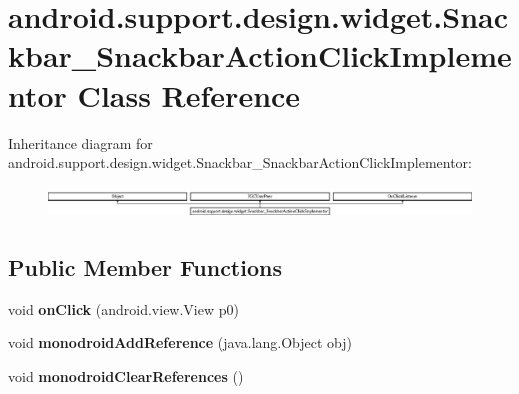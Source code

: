 \hypertarget{classandroid_1_1support_1_1design_1_1widget_1_1_snackbar___snackbar_action_click_implementor}{}\section{android.\+support.\+design.\+widget.\+Snackbar\+\_\+\+Snackbar\+Action\+Click\+Implementor Class Reference}
\label{classandroid_1_1support_1_1design_1_1widget_1_1_snackbar___snackbar_action_click_implementor}
Inheritance diagram for android.\+support.\+design.\+widget.\+Snackbar\+\_\+\+Snackbar\+Action\+Click\+Implementor\+:\begin{figure}[H]
\begin{center}
\leavevmode
\includegraphics[height=0.848485cm]{classandroid_1_1support_1_1design_1_1widget_1_1_snackbar___snackbar_action_click_implementor}
\end{center}
\end{figure}
\subsection*{Public Member Functions}
\begin{DoxyCompactItemize}
\item 
\mbox{\label{classandroid_1_1support_1_1design_1_1widget_1_1_snackbar___snackbar_action_click_implementor_a586c92095bd4bf2197feac9cf0024e30}} 
void {\bfseries on\+Click} (android.\+view.\+View p0)
\item 
\mbox{\label{classandroid_1_1support_1_1design_1_1widget_1_1_snackbar___snackbar_action_click_implementor_a16a751ffa24007d654bc9ce4f58393b1}} 
void {\bfseries monodroid\+Add\+Reference} (java.\+lang.\+Object obj)
\item 
\mbox{\label{classandroid_1_1support_1_1design_1_1widget_1_1_snackbar___snackbar_action_click_implementor_adc6c8f5bc2dfa81c878c441b7cd1aabe}} 
void {\bfseries monodroid\+Clear\+References} ()
\end{DoxyCompactItemize}
